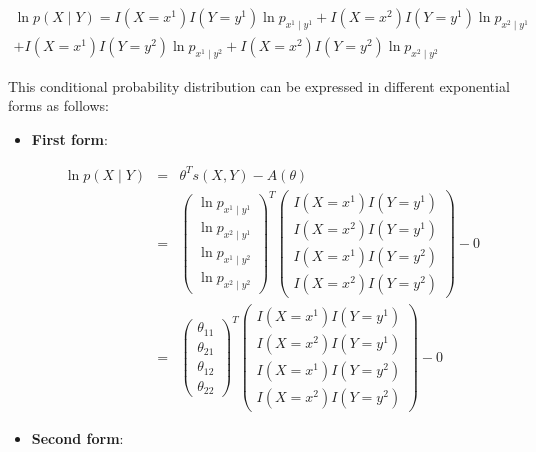 \documentclass[11pt, oneside]{article}   	%
\numberwithin{figure}{section}
\numberwithin{equation}{section}
\numberwithin{table}{section}
\theoremstyle{definition}
\begin{document}
\begin{appendices}
\begin{eqnarray*}
\ln p(X \mid Y) =  I(X= x^1) I(Y= y^1) \ln p_{x^1 \mid y^1} + I(X=x^2) I(Y= y^1) \ln p_{x^2 \mid y^1} \\
+ I(X=x^1) I(Y= y^2) \ln p_{x^1 \mid y^2} + I(X=x^2) I(Y= y^2) \ln p_{x^2 \mid y^2}
\end{eqnarray*}

This conditional probability distribution can be expressed in different exponential forms as follows:

\begin{itemize}

\item \textbf{First form}:

\begin{eqnarray*}
\ln p(X \mid Y) &=& \theta^T s(X,Y) - A(\theta) \\
&=&
\begin{pmatrix}
\ln p_{x^1 \mid y^1}\\
\ln p_{x^2 \mid y^1}\\
\ln p_{x^1 \mid y^2}\\
\ln p_{x^2 \mid y^2}
\end{pmatrix}^T
\begin{pmatrix}
I(X=x^1)I(Y=y^1) \\
I(X=x^2)I(Y=y^1) \\
I(X=x^1)I(Y=y^2) \\
I(X=x^2)I(Y=y^2) 
\end{pmatrix}
- 0\\
&=&
\begin{pmatrix}
\theta_{11}\\
\theta_{21}\\
\theta_{12}\\
\theta_{22}
\end{pmatrix}^T
\begin{pmatrix}
I(X=x^1)I(Y=y^1) \\
I(X=x^2)I(Y=y^1) \\
I(X=x^1)I(Y=y^2) \\
I(X=x^2)I(Y=y^2) 
\end{pmatrix}
- 0
\end{eqnarray*}

\item \textbf{Second form}:


\end{itemize}
\end{appendices}
\end{document}
